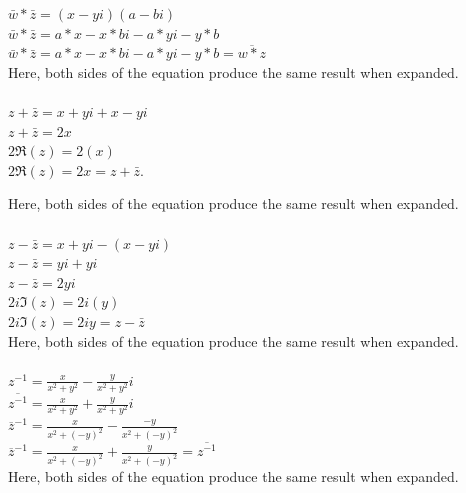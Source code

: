 \documentclass[12pt]{article}
\begin{document}
$\bar{w} * \bar{z} = (x-yi)(a-bi)$\\
$\bar{w} * \bar{z} = a*x - x*bi - a*yi - y*b$\\
$\bar{w} * \bar{z} = a*x - x*bi - a*yi - y*b = \overline{w*z}$\\

Here, both sides of the equation produce the same result when expanded.\\


\\
$z + \bar{z} = x + yi + x - yi$\\
$z + \bar{z} = 2x$\\
$2\Re(z) = 2(x)$\\

$2\Re(z) = 2x = z + \bar{z}$.

Here, both sides of the equation produce the same result when expanded.\\

\\

$z - \bar{z} = x + yi - (x - yi)$\\
$z - \bar{z} = yi + yi$\\
$z - \bar{z} = 2yi$\\

$ 2i\Im(z) = 2i(y)$\\

$ 2i\Im(z) = 2iy = z - \bar{z}$\\

Here, both sides of the equation produce the same result when expanded.\\

\\

$z^{-1} = \frac{x}{x^2+y^2} - \frac{y}{x^2+y^2}i$\\

$\overline{z^{-1}} = \frac{x}{x^2+y^2} + \frac{y}{x^2+y^2}i$\\
$\overline{z}^{-1} = \frac{x}{x^2 + (-y)^2} - \frac{-y}{x^2 + (-y)^2}$\\

$\overline{z}^{-1} = \frac{x}{x^2 + (-y)^2} + \frac{y}{x^2 + (-y)^2} = \overline{z^{-1}}$\\


Here, both sides of the equation produce the same result when expanded.\\

\\
\end{document}
